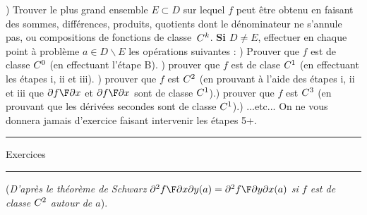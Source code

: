 \bigskip{}) Trouver le plus grand ensemble $E\subset D$ sur lequel $f$ peut être obtenu en faisant des sommes, différences, produits, quotients dont le dénominateur ne s'annule pas, ou compositions de fonctions de classe~$\sc C^k$. 
\medskip\noindent
{\bf Si $D\neq E$}, effectuer en chaque point à problème $a\in D\smallsetminus E$ les opérations suivantes : ) Prouver que $f$ est de classe $\sc C^0$ (en effectuant l'étape B). ) prouver que $f$ est de clase $\sc C^1$ (en effectuant les étapes i, ii et iii). ) prouver que $f$ est $\sc C^2$ (en prouvant à l'aide des étapes i, ii et iii que ${\partial f\F\partial x}$ et  ${\partial f\F\partial x}$ sont de classe $\sc C^1$).) prouver que $f$ est $\sc C^3$ (en prouvant que les dérivées secondes sont de classe $\sc C^1$).) ...etc...\pn
On ne vous donnera jamais d'exercice faisant intervenir les étapes 5+. 
\medskip
\hrule
\centerline{Exercices}
\hrule
\bigskip
{}\par\noindent
({\it D'après le théorème de Schwarz ${\partial^2f\F\partial x\partial y}(a)={\partial^2f\F\partial y\partial x}(a)$ si $f$ est de classe $\sc C^2$ autour de $a$}).
\goodbreak
{}
\vfill
{}
\vfill
{}
\vfill
{}
\vfill
{}
\vfill
{}
\vfill
{}
\vfill
{}
\vfill
{}
\vfill\null\eject
\bye
